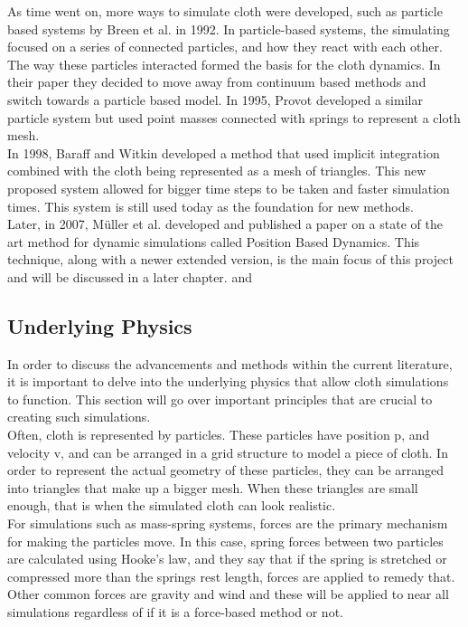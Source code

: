 \documentclass[12pt,a4paper]{article}
\begin{document}
As time went on, more ways to simulate cloth were developed, such as particle based systems by Breen et al. in 1992. In particle-based systems, the simulating focused on a series of connected particles, and how they react with each other. The way these particles interacted formed the basis for the cloth dynamics. \cite{breen1992physically} In their paper they decided to move away from continuum based methods and switch towards a particle based model. In 1995, Provot developed a similar particle system but used point masses connected with springs to represent a cloth mesh. \cite{provot1995deformation} \\

In 1998, Baraff and Witkin developed a method that used implicit integration combined with the cloth being represented as a mesh of triangles. This new proposed system allowed for bigger time steps to be taken and faster simulation times. This system is still used today as the foundation for new methods. \cite{Baraff1998largesteps} \\

Later, in 2007, Müller et al. developed and published a paper on a state of the art method for dynamic simulations called Position Based Dynamics. This technique, along with a newer extended version, is the main focus of this project and will be discussed in a later chapter. \cite{muller2007position} and \cite{macklin2016xpbd}

\subsection{Underlying Physics}
\label{Physics}
In order to discuss the advancements and methods within the current literature, it is important to delve into the underlying physics that allow cloth simulations to function. This section will go over important principles that are crucial to creating such simulations.
\\

Often, cloth is represented by particles. These particles have position p, and velocity v, and can be arranged in a grid structure to model a piece of cloth. In order to represent the actual geometry of these particles, they can be arranged into triangles that make up a bigger mesh. When these triangles are small enough, that is when the simulated cloth can look realistic.
\\

For simulations such as mass-spring systems, forces are the primary mechanism for making the particles move. In this case, spring forces between two particles are calculated using Hooke's law, and they say that if the spring is stretched or compressed more than the springs rest length, forces are applied to remedy that. Other common forces are gravity and wind and these will be applied to near all simulations regardless of if it is a force-based method or not.
\\
\end{document}
